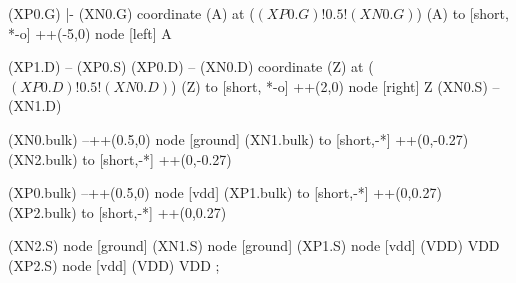 \begin{circuitikz}[american]
	(XP0.G) |- (XN0.G)
	coordinate (A) at ($(XP0.G)!0.5!(XN0.G)$)
	(A) to [short, *-o] ++(-5,0) node [left] {A}
	
	(XP1.D) -- (XP0.S)
	(XP0.D) -- (XN0.D)
	coordinate (Z) at ($(XP0.D)!0.5!(XN0.D)$)
	(Z) to [short, *-o] ++(2,0) node [right] {Z}
	(XN0.S) -- (XN1.D)
	
	(XN0.bulk) --++(0.5,0) node [ground]{}	
	(XN1.bulk) to [short,-*] ++(0,-0.27)
	(XN2.bulk) to [short,-*] ++(0,-0.27)
	
	(XP0.bulk) --++(0.5,0) node [vdd]{}
	(XP1.bulk) to [short,-*] ++(0,0.27)		
	(XP2.bulk) to [short,-*] ++(0,0.27)


	(XN2.S) node [ground] {}
	(XN1.S) node [ground] {}
	(XP1.S) node [vdd] (VDD) {VDD}
	(XP2.S) node [vdd] (VDD) {VDD}
;

\end{circuitikz}
